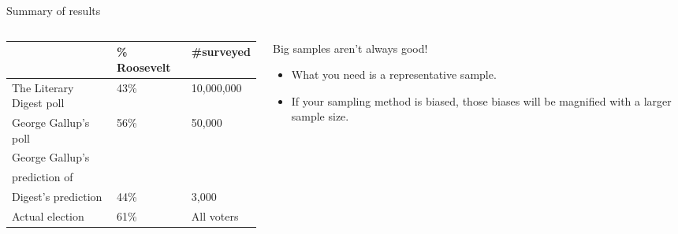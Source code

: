\documentclass[aspectratio=169]{../latex_main/tntbeamer}  %
\begin{document}
	\begin{frame}{Summary of results}
	    \begin{columns}
	        \begin{column}{.6\textwidth}
         
	            \begin{tabular}{|l|l|l|}
	                \hline
	                 & \% Roosevelt & \#surveyed  \\
	               \hline
	               The Literary Digest poll  & 43\%  & 10,000,000\\
	               \hline
	               George Gallup’s poll & 56\% & 50,000\\
	               \hline
	               George Gallup’s & & \\ prediction of& & \\ 
                      Digest’s prediction & 44\% & 3,000\\
	               \hline
	               Actual election & 61\% & All voters\\
	               \hline
	            \end{tabular}
             
	        \end{column}
	        
	        \begin{column}{.4\textwidth}
	            Big samples aren’t always good!
                \begin{itemize}
                    \item What you need is a representative sample. 
                    \item If your sampling method is biased, those biases will be magnified with a larger sample size.
                \end{itemize}
	        \end{column}
	        
	    \end{columns}
	    
	\end{frame}
	
\end{document}
